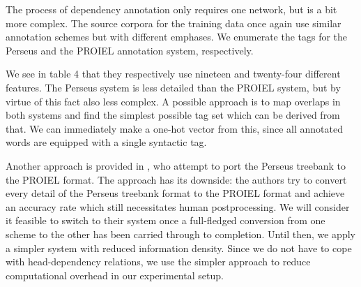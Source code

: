 The process of dependency annotation only requires one network, but is
a bit more complex. The source corpora for the training data once
again use similar annotation schemes but with different emphases. We
enumerate the tags for the Perseus and the PROIEL annotation system,
respectively.

We see in table 4 that they respectively use nineteen and twenty-four
different features. The Perseus system is less detailed than the
PROIEL system, but by virtue of this fact also less complex. A
possible approach is to map overlaps in both systems and find the
simplest possible tag set which can be derived from that. We can
immediately make a one-hot vector from this, since all annotated words
are equipped with a single syntactic tag. 

Another approach is provided in \cite{conf/lrec/LeeH10}, who attempt
to port the Perseus treebank to the PROIEL format. The approach has
its downside: the authors try to convert every detail of the Perseus
treebank format to the PROIEL format and achieve an accuracy rate
which still necessitates human postprocessing. We will consider it
feasible to switch to their system once a full-fledged conversion from
one scheme to the other has been carried through to completion. Until
then, we apply a simpler system with reduced information
density. Since we do not have to cope with head-dependency relations,
we use the simpler approach to reduce computational overhead in our
experimental setup.
